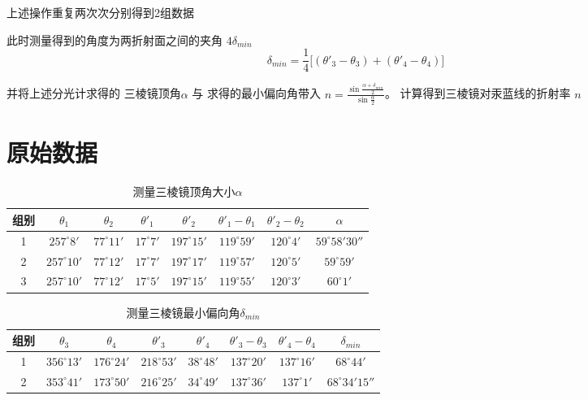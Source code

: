 \documentclass[UTF8]{ctexart}
\begin{document}
上述操作重复两次次分别得到2组数据

此时测量得到的角度为两折射面之间的夹角 $4 \delta_{min} $
$$ \delta_{min} = \frac{1}{4}  \big[ (\theta'_3 - \theta_3 ) + (\theta'_4 - \theta_4 )\big]$$

并将上述分光计求得的 三棱镜顶角$\alpha$ 与 求得的最小偏向角带入 $n = \frac{\sin \frac{\alpha + \delta_{min}}{2}}{\sin \frac{\alpha}{2}} $。 计算得到三棱镜对汞蓝线的折射率 $n$


\section{原始数据}

\begin{table}[H]
    \centering
    \caption{测量三棱镜顶角大小$\alpha$}
    \begin{tabular}{|c|c|c|c|c|c|c|c|}
    \toprule[1pt]
       组别  &   $\theta_1$ & $\theta_2$ & $\theta'_1$ & $\theta'_2$ & $\theta'_1 - \theta_1$ & $\theta'_2 - \theta_2$ & $\alpha$ \\
    \midrule
       1  &  $257^{\circ}8'$ & $77^{\circ}11'$ & $17^{\circ}7'$  &  $197^{\circ}15'$ & $119^{\circ}59'$ & $120^{\circ}4'$  & $59^{\circ}58'30''$\\
    \midrule
       2  & $257^{\circ}10'$  & $ 77^{\circ}12'$ & $17^{\circ}7'$  & $197^{\circ}17'$ & $119^{\circ}57'$  & $120^{\circ}5'$ & $59^{\circ}59'$\\
    \midrule
       3  & $257^{\circ}10'$ & $77^{\circ}12'$ & $17^{\circ}5'$  & $197^{\circ}15'$  &
       $119^{\circ}55'$  & $120^{\circ}3'$ & $60^{\circ}1'$ \\
    \bottomrule[1pt]
    \end{tabular}
\end{table}

\begin{table}[H]
    \centering
    \caption{测量三棱镜最小偏向角$\delta_{min}$}
    \begin{tabular}{|c|c|c|c|c|c|c|c|}
    \toprule[1pt]
       组别  &   $\theta_3$ & $\theta_4$ & $\theta'_3$ & $\theta'_4$ & $\theta'_3 - \theta_3$ & $\theta'_4 - \theta_4$ & $\delta_{min}$ \\
    \midrule
       1  &  $356^{\circ}13'$ & $176^{\circ}24'$ & $218^{\circ}53'$  &  $38^{\circ}48'$ & $137^{\circ}20'$ & $137^{\circ}16'$  & $68^{\circ}44'$\\
    \midrule
       2  & $353^{\circ}41'$  & $ 173^{\circ}50'$ & $216^{\circ}25'$  & $34^{\circ}49'$ & $137^{\circ}36'$  & $137^{\circ}1'$ & $68^{\circ}34'15''$\\
    \bottomrule[1pt]
    \end{tabular}
\end{table}
\end{document}

